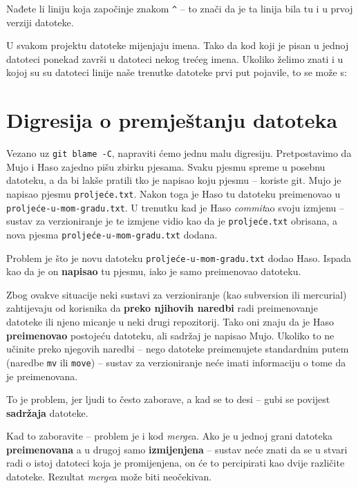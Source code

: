 

Nađete li liniju koja započinje znakom \verb+^+ -- to znači da je ta linija bila tu i u prvoj verziji datoteke.

U svakom projektu datoteke mijenjaju imena. 
Tako da kod koji je pisan u jednoj datoteci ponekad završi u datoteci nekog trećeg imena.
Ukoliko želimo znati i u kojoj su su datoteci linije naše trenutke datoteke prvi put pojavile, to se može s:


\section*{Digresija o premještanju datoteka}

Vezano uz \verb+git blame -C+, napraviti ćemo jednu malu digresiju.
Pretpostavimo da Mujo i Haso zajedno pišu zbirku pjesama.
Svaku pjesmu spreme u posebnu datoteku, a da bi lakše pratili tko je napisao koju pjesmu -- koriste git.
Mujo je napisao pjesmu \verb+proljeće.txt+.
Nakon toga je Haso tu datoteku preimenovao u \verb+proljeće-u-mom-gradu.txt+.
U trenutku kad je Haso \emph{commit}ao svoju izmjenu -- sustav za verzioniranje je te izmjene vidio kao da je \verb+proljeće.txt+ obrisana, a nova pjesma  \verb+proljeće-u-mom-gradu.txt+ dodana.

Problem je što je novu datoteku \verb+proljeće-u-mom-gradu.txt+ dodao Haso.
Ispada kao da je on \textbf{napisao} tu pjesmu, iako je samo preimenovao datoteku.

Zbog ovakve situacije neki sustavi za verzioniranje (kao subversion ili mercurial) zahtijevaju od korisnika da \textbf{preko njihovih naredbi} radi preimenovanje datoteke ili njeno micanje u neki drugi repozitorij.
Tako oni znaju da je Haso \textbf{preimenovao} postojeću datoteku, ali sadržaj je napisao Mujo.
Ukoliko to ne učinite preko njegovih naredbi -- nego datoteke preimenujete standardnim putem (naredbe \verb+mv+ ili \verb+move+) -- sustav za verzioniranje neće imati informaciju o tome da je preimenovana. 

To je problem, jer ljudi to često zaborave, a kad se to desi -- gubi se povijest \textbf{sadržaja} datoteke.

Kad to zaboravite -- problem je i kod \emph{merge}a.
Ako je u jednoj grani datoteka \textbf{preimenovana} a u drugoj samo \textbf{izmijenjena} -- sustav neće znati da se u stvari radi o istoj datoteci koja je promijenjena, on će to percipirati kao dvije različite datoteke.
Rezultat \emph{merge}a može biti neočekivan.

